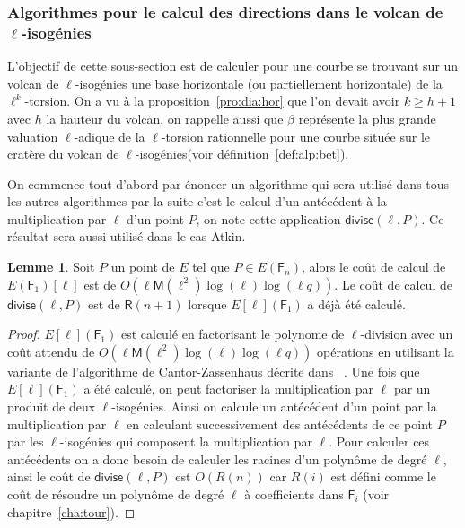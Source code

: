 \documentclass[10pt,a4paper]{book}
\theoremstyle{plain}
\theoremstyle{definition}
\newtheorem{lem}[thm]{Lemme}
\theoremstyle{definition}
\theoremstyle{definition}
\theoremstyle{definition}
\theoremstyle{remark}
\theoremstyle{remark}
\theoremstyle{definition}
\begin{document}
\subsubsection{Algorithmes pour le calcul des directions dans le volcan de $\ell$-isogénies}

L'objectif de cette sous-section est de calculer pour une courbe se trouvant 
sur un volcan de $\ell$-isogénies une base horizontale (ou partiellement 
horizontale) de la $\ell^k$-torsion. On a vu à la proposition~\ref{pro:dia:hor}
que l'on devait avoir $k \geqslant h+1$ avec $h$ la hauteur du volcan, on 
rappelle aussi que $\beta$ représente la plus grande valuation $\ell$-adique de
la $\ell$-torsion rationnelle pour une courbe située sur le cratère du volcan 
de $\ell$-isogénies(voir définition~\ref{def:alp:bet}).

On commence tout d'abord par énoncer un algorithme qui sera utilisé dans tous 
les autres algorithmes par la suite c'est le calcul d'un antécédent à la 
multiplication par $\ell$ d'un point $P$, on note cette application 
$\mathsf{divise}(\ell,P)$. Ce résultat sera aussi utilisé dans le cas Atkin.

\begin{lem}
\label{lem:div:cou}
Soit $P$ un point de $E$ tel que $P \in E(\mathsf{F}_{n})$, alors le coût de calcul de $E(\mathsf{F}_1)[\ell]$ est de $O(\ell \mathsf{M}(\ell^2)\log(\ell)\log(\ell q))$. Le coût de calcul de $\mathsf{divise}(\ell,P)$ est de $\mathsf{R}(n+1)$ lorsque $E[\ell](\mathsf{F}_1)$ a déjà été calculé.
\end{lem}

\begin{proof}
$E[\ell](\mathsf{F}_1)$ est calculé en factorisant le polynome de 
$\ell$-division 
avec un coût attendu de $O(\ell \mathsf{M}(\ell^2)\log(\ell)\log(\ell q))$
opérations en utilisant la variante de l'algorithme de Cantor-Zassenhaus 
décrite dans ~\cite[Chapter~14.5]{vzGJG03}.
  Une fois que $E[\ell](\mathsf{F}_1)$ a été calculé, on peut factoriser la
  multiplication par $\ell$ par un produit de deux $\ell$-isogénies. Ainsi on
   calcule un antécédent d'un point par la multiplication par $\ell$ en 
   calculant successivement des antécédents de ce point $P$ par les 
   $\ell$-isogénies qui composent la multiplication par $\ell$. Pour calculer 
   ces antécédents on a donc besoin de calculer les racines d'un polynôme de 
   degré $\ell$, ainsi le coût de $\mathsf{divise}(\ell,P)$ est $O(R(n))$ car 
   $R(i)$ est défini comme le coût de résoudre un polynôme de degré $\ell$ à 
   coefficients dans $\mathsf{F}_i$ (voir chapitre~\ref{cha:tour}).  
\end{proof}
\end{document}
